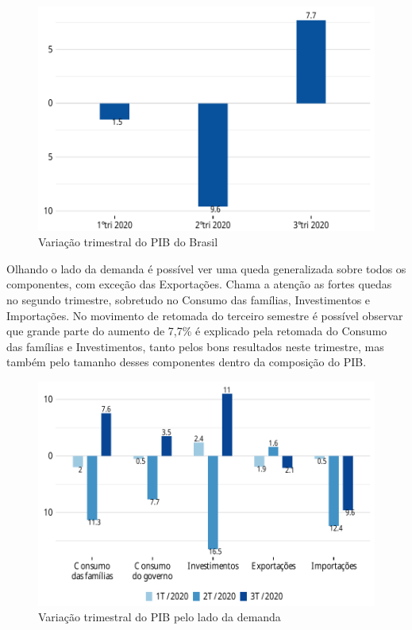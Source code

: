 \begin{figure}[h]
	\caption{Variação trimestral do PIB do Brasil}
	\includegraphics{fig/pib_total.pdf}
\end{figure}
\par Olhando o lado da demanda é possível ver uma queda generalizada sobre todos os componentes, com exceção das Exportações. Chama a atenção as fortes quedas no segundo trimestre, sobretudo no Consumo das famílias, Investimentos e Importações. No movimento de retomada do terceiro semestre é possível observar que grande parte do aumento de 7,7\% é explicado pela retomada do Consumo das famílias e Investimentos, tanto pelos bons resultados neste trimestre, mas também pelo tamanho desses componentes dentro da composição do PIB.
\begin{figure}[h]
	\caption{Variação trimestral do PIB pelo lado da demanda}
	\includegraphics{fig/pib_demanda.pdf}
\end{figure}
